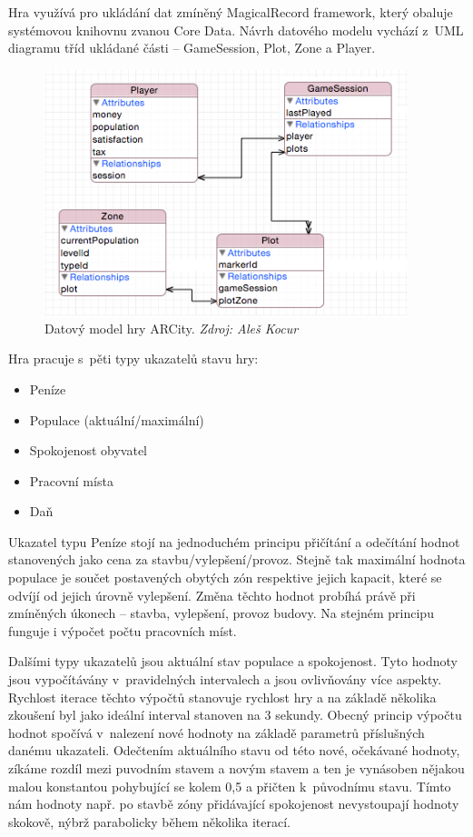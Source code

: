 \documentclass[twoside,12pt]{article}
\begin{document}
 Hra využívá pro ukládání dat zmíněný MagicalRecord framework, který obaluje systémovou knihovnu zvanou Core Data. Návrh datového modelu vychází z~UML diagramu tříd ukládané části -- GameSession, Plot, Zone a Player.
 
 \begin{figure}[H]
\centering
    \includegraphics[width=400px, center]{images/core-data-model.png}
\captionsetup{justification=centering}
    \caption{Datový model hry ARCity. \textit{Zdroj: Aleš Kocur}}
    \label{class_diagram}
\end{figure}

 
 Hra pracuje s~pěti typy ukazatelů stavu hry:
  
 \begin{itemize}
\item Peníze
\item Populace (aktuální/maximální)
\item Spokojenost obyvatel
\item Pracovní místa
\item Daň
\end{itemize}
 
 Ukazatel typu Peníze stojí na jednoduchém principu přičítání a odečítání hodnot stanovených jako cena za stavbu/vylepšení/provoz. Stejně tak maximální hodnota populace je součet postavených obytých zón respektive jejich kapacit, které se odvíjí od jejich úrovně vylepšení. Změna těchto hodnot probíhá právě při zmíněných úkonech -- stavba, vylepšení, provoz budovy. Na stejném principu funguje i výpočet počtu pracovních míst.
 
 Dalšími typy ukazatelů jsou aktuální stav populace a spokojenost. Tyto hodnoty jsou vypočítávány v~pravidelných intervalech a jsou ovlivňovány více aspekty. Rychlost iterace těchto výpočtů stanovuje rychlost hry a na základě několika zkoušení byl jako ideální interval stanoven na 3 sekundy. Obecný princip výpočtu hodnot spočívá v~nalezení nové hodnoty na základě parametrů příslušných danému ukazateli. Odečtením aktuálního stavu od této nové, očekávané hodnoty, zíkáme rozdíl mezi puvodním stavem a novým stavem a ten je vynásoben nějakou malou konstantou pohybující se kolem 0,5 a přičten k~původnímu stavu. Tímto nám hodnoty např. po stavbě zóny přidávající spokojenost nevystoupají hodnoty skokově, nýbrž parabolicky během několika iterací.
 
\end{document}
